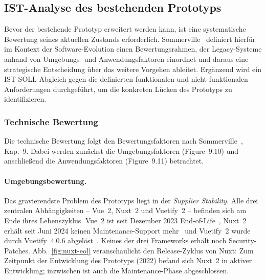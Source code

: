 
\subsection{IST-Analyse des bestehenden Prototyps}\label{sec:ist-analyse}

Bevor der bestehende Prototyp erweitert werden kann, ist eine systematische Bewertung seines aktuellen Zustands erforderlich.
Sommerville~\cite{sommerville2016software} definiert hierfür im Kontext der Software-Evolution einen Bewertungsrahmen, der Legacy-Systeme anhand von Umgebungs- und Anwendungsfaktoren einordnet und daraus eine strategische Entscheidung über das weitere Vorgehen ableitet.
Ergänzend wird ein IST-SOLL-Abgleich gegen die definierten funktionalen und nicht-funktionalen Anforderungen durchgeführt, um die konkreten Lücken des Prototyps zu identifizieren.

\subsubsection{Technische Bewertung}\label{sec:technische-bewertung}

Die technische Bewertung folgt den Bewertungsfaktoren nach Sommerville~\cite{sommerville2016software}, Kap.~9.
Dabei werden zunächst die Umgebungsfaktoren (Figure~9.10) und anschließend die Anwendungsfaktoren (Figure~9.11) betrachtet.

\paragraph{Umgebungsbewertung.}

Das gravierendste Problem des Prototyps liegt in der \emph{Supplier Stability}.
Alle drei zentralen Abhängigkeiten -- Vue~2, Nuxt~2 und Vuetify~2 -- befinden sich am Ende ihres Lebenszyklus.
Vue~2 ist seit Dezember 2023 End-of-Life~\cite{eol2026vue}, Nuxt~2 erhält seit Juni 2024 keinen Maintenance-Support mehr~\cite{eol2026nuxt} und Vuetify~2 wurde durch Vuetify~4.0.6 abgelöst~\cite{eol2026vuetify}.
Keines der drei Frameworks erhält noch Security-Patches.
Abb.~\ref{fig:nuxt-eol} veranschaulicht den Release-Zyklus von Nuxt: Zum Zeitpunkt der Entwicklung des Prototyps (2022) befand sich Nuxt~2 in aktiver Entwicklung; inzwischen ist auch die Maintenance-Phase abgeschlossen.

